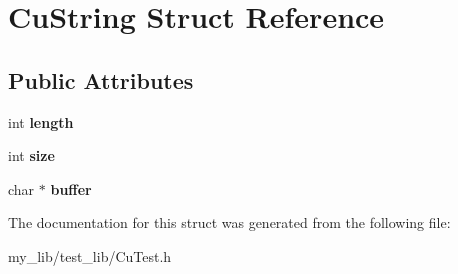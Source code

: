 \hypertarget{structCuString}{}\section{Cu\+String Struct Reference}
\label{structCuString}
\subsection*{Public Attributes}
\begin{DoxyCompactItemize}
\item 
\mbox{\label{structCuString_a5e715d2b207fe60a0433e8bf0ed0e470}} 
int {\bfseries length}
\item 
\mbox{\label{structCuString_abddb898dd12ac916879510d4c4c97f05}} 
int {\bfseries size}
\item 
\mbox{\label{structCuString_ab202a8630764f5864030f8a8a4ae6911}} 
char $\ast$ {\bfseries buffer}
\end{DoxyCompactItemize}


The documentation for this struct was generated from the following file\+:\begin{DoxyCompactItemize}
\item 
my\+\_\+lib/test\+\_\+lib/Cu\+Test.\+h\end{DoxyCompactItemize}
